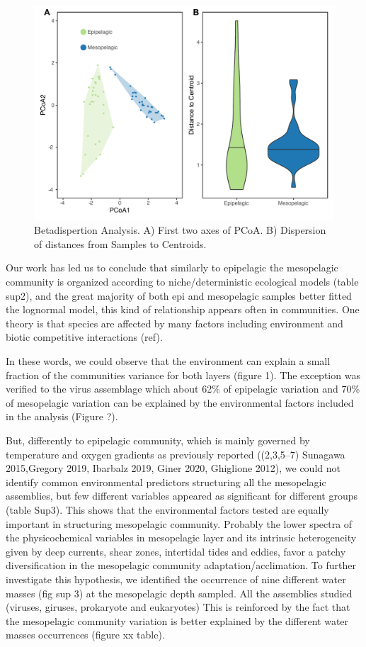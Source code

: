 \documentclass[fleqn,10pt]{wlscirep}
\begin{document}
\begin{figure}[ht]
    \centering
    \includegraphics[scale=0.5]{images/betadisp_diganose_to_print.pdf}
    \caption{Betadispertion Analysis. A) First two axes of PCoA. B) Dispersion of distances from Samples to Centroids.}
    \label{fig:betadipersion}
\end{figure}

Our work has led us to conclude that similarly to epipelagic the mesopelagic community is organized according to niche/deterministic ecological models (table sup2), and the great majority of both epi and mesopelagic samples better fitted the lognormal model, this kind of relationship appears often in communities. One theory is that species are affected by many factors including environment and biotic competitive interactions (ref). 

In these words, we could observe that the environment can explain a small fraction of the communities variance for both layers (figure 1). The exception was verified to the virus assemblage which about 62\% of epipelagic variation and 70\% of mesopelagic variation can be explained by the environmental factors included in the analysis (Figure ?). 

But, differently to epipelagic community, which is mainly governed by temperature and oxygen gradients as previously reported ((2,3,5–7) Sunagawa 2015,Gregory 2019, Ibarbalz 2019, Giner 2020, Ghiglione 2012), we could not identify common environmental predictors structuring all the mesopelagic assemblies, but few different variables appeared as significant for different groups (table Sup3). This shows that the environmental factors tested are equally important in structuring mesopelagic community. Probably the lower spectra of the physicochemical variables in mesopelagic layer and its intrinsic heterogeneity given by deep currents, shear zones, intertidal tides and eddies, favor a patchy diversification in the mesopelagic community adaptation/acclimation. To further investigate this hypothesis, we identified the occurrence of nine different water masses (fig sup 3) at the mesopelagic depth sampled. All the assemblies studied (viruses, giruses, prokaryote and eukaryotes) This is reinforced by the fact that the mesopelagic community variation is better explained by the different water masses occurrences (figure xx table).
\end{document}
